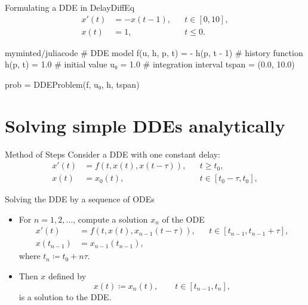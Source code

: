 \documentclass[aspectratio=169]{beamer}
\begin{document}
\begin{frame}[fragile]{Formulating a DDE in DelayDiffEq}
  \begin{align*}
    x'(t) &= - x(t - 1), && t \in [0, 10], \\
    x(t) &= 1, && t \leq 0.
  \end{align*}

  \pause

  \begin{tcblisting}{myminted/juliacode}
    # DDE model
    f(u, h, p, t) = - h(p, t - 1)
    # history function
    h(p, t) = 1.0
    # initial value
    u₀ = 1.0
    # integration interval
    tspan = (0.0, 10.0)

    prob = DDEProblem(f, u₀, h, tspan)
  \end{tcblisting}
\end{frame}

\section{Solving simple DDEs analytically}

\begin{frame}{Method of Steps}
  Consider a DDE with one constant delay:
  \begin{align*}
    x'(t) &= f(t, x(t), x(t-\tau)), && t \geq t_0,\\
    x(t) &= x_0(t), && t \in [t_0 - \tau, t_0],
  \end{align*}

  \pause

  \begin{block}{Solving the DDE by a sequence of ODEs}
    \begin{itemize}[<+->]
    \item For $n = 1,2,\ldots$, compute a solution $x_n$ of the ODE
      \begin{align*}
        x'(t) &= f(t, x(t), x_{n-1}(t-\tau)), && t \in [t_{n-1}, t_{n-1} + \tau],\\
        x(t_{n-1}) &= x_{n-1}(t_{n-1}),
      \end{align*}
      where $t_n \coloneqq t_0 + n \tau$.
    \item Then $x$ defined by
      \begin{equation*}
        x(t) \coloneqq x_n(t), \qquad t \in [t_{n-1}, t_n],
      \end{equation*}
      is a solution to the DDE.
    \end{itemize}
    \end{block}
\end{frame}
\end{document}
